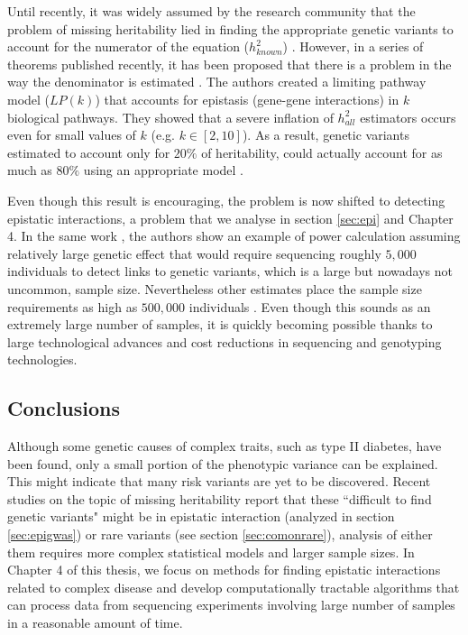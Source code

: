 Until recently, it was widely assumed by the research community that the problem of missing heritability lied in finding the appropriate genetic variants to account for the numerator of the equation ($h^2_{known}$) \cite{zuk2012mystery}. However, in a series of theorems published recently, it has been proposed that there is a problem in the way the denominator is estimated \cite{zuk2012mystery}. The authors created a limiting pathway model ($LP(k)$) that accounts for epistasis (gene-gene interactions) in $k$ biological pathways. They showed that a severe inflation of $h^2_{all}$ estimators occurs even for small values of $k$ (e.g. $k \in [2,10]$). As a result, genetic variants estimated to account only for $20\%$ of heritability, could actually account for as much as $80\%$ using an appropriate model \cite{zuk2012mystery}.

Even though this result is encouraging, the problem is now shifted to detecting epistatic interactions, a problem that we analyse in section \ref{sec:epi} and Chapter 4. In the same work \cite{zuk2012mystery}, the authors show an example of power calculation assuming relatively large genetic effect that would require sequencing roughly $5,000$ individuals to detect links to genetic variants, which is a large but nowadays not uncommon, sample size. Nevertheless other estimates place the sample size requirements as high as  $500,000$ individuals \cite{zuk2012mystery}. Even though this sounds as an extremely large number of samples, it is quickly becoming possible thanks to large technological advances and cost reductions in sequencing and genotyping technologies.

\subsection{Conclusions}

Although some genetic causes of complex traits, such as type II diabetes, have been found, only a small portion of the phenotypic variance can be explained. This might indicate that many risk variants are yet to be discovered. Recent studies on the topic of missing heritability report that these ``difficult to find genetic variants" might be in epistatic interaction (analyzed in section \ref{sec:epigwas}) or rare variants (see section \ref{sec:comonrare}), analysis of either them requires more complex statistical models and larger sample sizes. In Chapter 4 of this thesis, we focus on methods for finding epistatic interactions related to complex disease and develop computationally tractable algorithms that can process data from sequencing experiments involving large number of samples in a reasonable amount of time.

